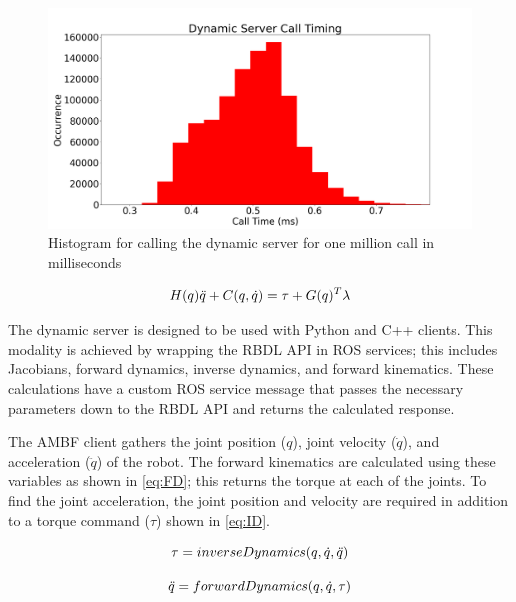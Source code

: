  \begin{figure}
     \centering
     \includegraphics[scale=0.35]{images/software/dyn_loop_timing.png}
     \caption[Dynamic Timing Histogram]{Histogram for calling the dynamic server for one million call in milliseconds}
     \label{fig:DynCommunicationHistogram}
 \end{figure}
 


\begin{equation}
\Large
    H(q) \Ddot{q} + C(q,\Dot{q}) = \tau + G(q)^T \lambda
    \label{eq:motion}
\end{equation}



The dynamic server is designed to be used with Python and C++ clients. This modality is achieved by wrapping the RBDL API in ROS services; this includes Jacobians, forward dynamics, inverse dynamics, and forward kinematics. These calculations have a custom ROS service message that passes the necessary parameters down to the RBDL API and returns the calculated response. 

The AMBF client gathers the joint position ($q$), joint velocity ($\Dot{q}$), and acceleration ($\DDot{q}$) of the robot.  The forward kinematics are calculated using these variables as shown in \autoref{eq:FD}; this returns the torque at each of the joints. To find the joint acceleration, the joint position and velocity are required in addition to a torque command ($\tau$) shown in \autoref{eq:ID}.  

\begin{equation}
    \Large
    \tau = inverseDynamics(q,\Dot{q}, \Ddot{q})
    \label{eq:ID}
\end{equation}


\begin{equation}
    \Large
    \Ddot{q} = forwardDynamics(q,\Dot{q}, \tau )
    \label{eq:FD}
\end{equation}



